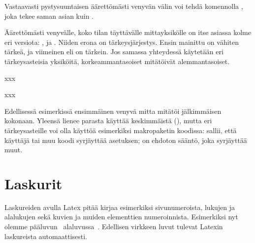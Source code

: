 Vastaavasti pystysuuntaisen äärettömästi venyvän välin voi tehdä
komennolla , joka tekee saman asian kuin .

Äärettömästi venyvälle, koko tilan täyttävälle mittayksikölle on itse
asiassa kolme eri versiota: ,  ja .
Niiden erona on tärkeysjärjestys. Ensin mainittu  on vähiten
tärkeä, ja viimeinen eli  on tärkein. Jos samassa
yhteydessä käytetään eri tär\-keys\-as\-tei\-sia yksiköitä,
korkeammantasoiset mitätöivät alemmantasoiset.


\begin{koodilohkosis}
  x\hspace{0mm plus 1filll}x\hspace{0mm plus 1fill}x
\end{koodilohkosis}

\begin{tulossis}
  x\hspace{0mm plus 1filll}x\hspace{0mm plus 1fill}x
\end{tulossis}

Edellisessä esimerkissä ensimmäinen venyvä mitta  mitätöi
jälkimmäisen  kokonaan. Yleensä lienee parasta käyttää
keskimmäistä (), mutta eri tär\-keys\-as\-teil\-le voi olla
käyttöä esimerkiksi makropaketin koodissa:  sallii, että
käyttäjä tai muu koodi syrjäyttää asetuksen;  on ehdoton
sääntö, joka syrjäyttää muut.

\section{Laskurit}

Laskureiden avulla Latex pitää kirjaa esimerkiksi sivunumeroista,
lukujen ja alalukujen sekä kuvien ja muiden elementtien numeroinnista.
Esimerkiksi nyt olemme pääluvun~
alaluvussa~. Edellisen virkkeen luvut tulevat Latexin
laskureista automaattisesti.


